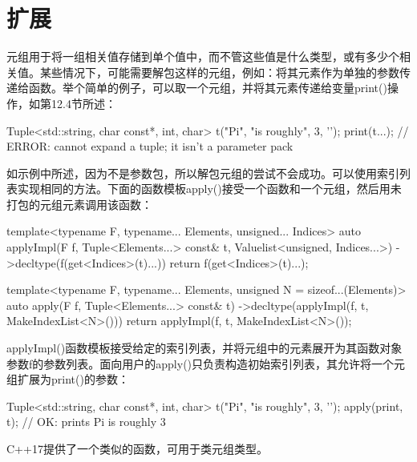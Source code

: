 \section{扩展}
元组用于将一组相关值存储到单个值中，而不管这些值是什么类型，或有多少个相关值。某些情况下，可能需要解包这样的元组，例如：将其元素作为单独的参数传递给函数。举个简单的例子，可以取一个元组，并将其元素传递给变量print()操作，如第12.4节所述：

\begin{cpp}
Tuple<std::string, char const*, int, char> t("Pi", "is roughly",
3, '\n');
print(t...); // ERROR: cannot expand a tuple; it isn't a parameter pack
\end{cpp}

如示例中所述，因为不是参数包，所以解包元组的尝试不会成功。可以使用索引列表实现相同的方法。下面的函数模板apply()接受一个函数和一个元组，然后用未打包的元组元素调用该函数：

\begin{cpp}
template<typename F, typename... Elements, unsigned... Indices>
auto applyImpl(F f, Tuple<Elements...> const& t,
					Valuelist<unsigned, Indices...>)
	->decltype(f(get<Indices>(t)...)) {
	return f(get<Indices>(t)...);
}

template<typename F, typename... Elements,
		unsigned N = sizeof...(Elements)>
auto apply(F f, Tuple<Elements...> const& t)
	->decltype(applyImpl(f, t, MakeIndexList<N>())) {
	return applyImpl(f, t, MakeIndexList<N>());
}
\end{cpp}

applyImpl()函数模板接受给定的索引列表，并将元组中的元素展开为其函数对象参数f的参数列表。面向用户的apply()只负责构造初始索引列表，其允许将一个元组扩展为print()的参数：

\begin{cpp}
Tuple<std::string, char const*, int, char> t("Pi", "is roughly",
												3, '\n');
apply(print, t); // OK: prints Pi is roughly 3
\end{cpp}

C++17提供了一个类似的函数，可用于类元组类型。






































